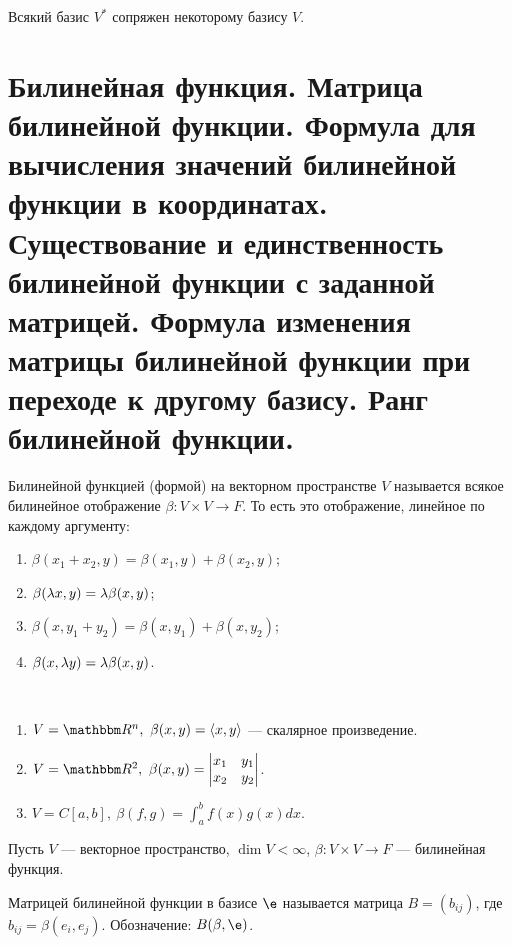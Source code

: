 \begin{Task}
Всякий базис $V^*$ сопряжен некоторому базису $V$.
\end{Task}

\section{Билинейная функция. Матрица билинейной функции. Формула для вычисления значений билинейной функции в координатах. Существование и единственность билинейной функции с заданной матрицей. Формула изменения матрицы билинейной функции при переходе к другому базису. Ранг билинейной функции.}

\begin{Def}
Билинейной функцией (формой) на векторном пространстве $V$ называется всякое билинейное отображение $\beta \colon V \times V \rightarrow F$. То есть это отображение, линейное по каждому аргументу:
\begin{enumerate}
\item $\beta(x_1 + x_2, y) = \beta(x_1, y) + \beta(x_2, y)$; 
\item $\beta(\lambda x, y) = \lambda\beta(x, y)$;
\item $\beta(x, y_1 + y_2) = \beta(x, y_1) + \beta(x, y_2)$;
\item $\beta(x, \lambda y) = \lambda\beta(x, y)$.
\end{enumerate}
\end{Def}

\begin{Examples}\
\begin{enumerate}
\item $V = \R^n,\ \beta(x, y) = \langle x, y \rangle$ --- скалярное произведение. 
\item $V = \R^2,\ \beta(x, y) = \begin{vmatrix}x_1 & y_1 \\ x_2 & y_2\end{vmatrix}$.
\item $V = C[a, b],\ \beta(f, g) = \int_a^bf(x)g(x)dx$.
\end{enumerate}
\end{Examples}

Пусть $V$ --- векторное пространство, $\dim V < \infty$, $\beta \colon V \times V \rightarrow F$ --- билинейная функция.

\begin{Def}
Матрицей билинейной функции в базисе $\e$ называется матрица $B = (b_{ij})$, где $b_{ij} = \beta(e_i, e_j)$. Обозначение: $B(\beta, \e)$.
\end{Def}

